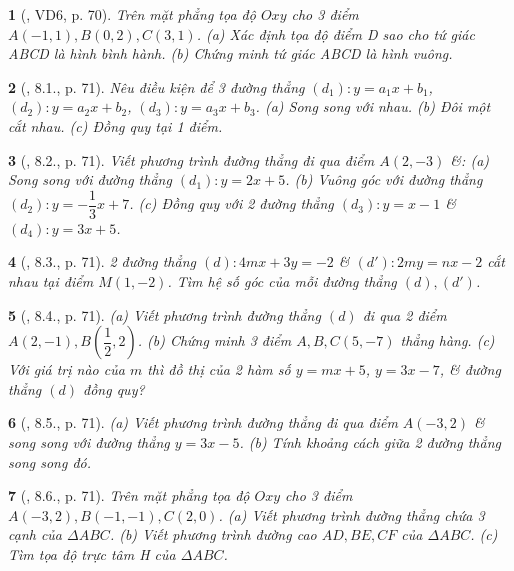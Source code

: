 \documentclass{article}
\newtheorem{baitoan}{}
\begin{document}
\begin{baitoan}[\cite{Binh_boi_duong_Toan_9_tap_1}, VD6, p. 70]
	Trên mặt phẳng tọa độ $Oxy$ cho 3 điểm $A(-1,1),B(0,2),C(3,1)$. (a) Xác định tọa độ điểm D sao cho tứ giác ABCD là hình bình hành. (b) Chứng minh tứ giác ABCD là hình vuông.
\end{baitoan}

\begin{baitoan}[\cite{Binh_boi_duong_Toan_9_tap_1}, 8.1., p. 71]
	Nêu điều kiện để 3 đường thẳng $(d_1):y = a_1x + b_1$, $(d_2):y = a_2x + b_2$, $(d_3):y = a_3x + b_3$. (a) Song song với nhau. (b) Đôi một cắt nhau. (c) Đồng quy tại 1 điểm.
\end{baitoan}

\begin{baitoan}[\cite{Binh_boi_duong_Toan_9_tap_1}, 8.2., p. 71]
	Viết phương trình đường thẳng đi qua điểm $A(2,-3)$ \&: (a) Song song với đường thẳng $(d_1):y = 2x + 5$. (b) Vuông góc với đường thẳng $(d_2):y = -\dfrac{1}{3}x + 7$. (c) Đồng quy với 2 đường thẳng $(d_3):y = x - 1$ \& $(d_4):y = 3x + 5$.
\end{baitoan}

\begin{baitoan}[\cite{Binh_boi_duong_Toan_9_tap_1}, 8.3., p. 71]
	2 đường thẳng $(d):4mx + 3y = -2$ \& $(d'):2my = nx - 2$ cắt nhau tại điểm $M(1,-2)$. Tìm hệ số góc của mỗi đường thẳng $(d),(d')$.
\end{baitoan}

\begin{baitoan}[\cite{Binh_boi_duong_Toan_9_tap_1}, 8.4., p. 71]
	(a) Viết phương trình đường thẳng $(d)$ đi qua 2 điểm $A(2,-1),B\left(\dfrac{1}{2},2\right)$. (b) Chứng minh 3 điểm $A,B,C(5,-7)$ thẳng hàng. (c) Với giá trị nào của $m$ thì đồ thị của 2 hàm số $y = mx + 5$, $y = 3x - 7$, \& đường thẳng $(d)$ đồng quy?
\end{baitoan}

\begin{baitoan}[\cite{Binh_boi_duong_Toan_9_tap_1}, 8.5., p. 71]
	(a) Viết phương trình đường thẳng đi qua điểm $A(-3,2)$ \& song song với đường thẳng $y = 3x - 5$. (b) Tính khoảng cách giữa 2 đường thẳng song song đó.
\end{baitoan}

\begin{baitoan}[\cite{Binh_boi_duong_Toan_9_tap_1}, 8.6., p. 71]
	Trên mặt phẳng tọa độ $Oxy$ cho 3 điểm $A(-3,2),B(-1,-1),C(2,0)$. (a) Viết phương trình đường thẳng chứa 3 cạnh của $\Delta ABC$. (b) Viết phương trình đường cao $AD,BE,CF$ của $\Delta ABC$. (c) Tìm tọa độ trực tâm H của $\Delta ABC$.
\end{baitoan}
\end{document}
